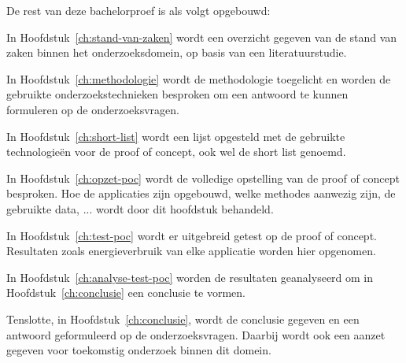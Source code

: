 
De rest van deze bachelorproef is als volgt opgebouwd:

In Hoofdstuk~\ref{ch:stand-van-zaken} wordt een overzicht gegeven van de stand van zaken binnen het onderzoeksdomein, op basis van een literatuurstudie.

In Hoofdstuk~\ref{ch:methodologie} wordt de methodologie toegelicht en worden de gebruikte onderzoekstechnieken besproken om een antwoord te kunnen formuleren op de onderzoeksvragen.

In Hoofdstuk~\ref{ch:short-list} wordt een lijst opgesteld met de gebruikte technologieën voor de proof of concept, ook wel de short list genoemd.

In Hoofdstuk~\ref{ch:opzet-poc} wordt de volledige opstelling van de proof of concept besproken. Hoe de applicaties zijn opgebouwd, welke methodes aanwezig zijn, de gebruikte data, ... wordt door dit hoofdstuk behandeld.

In Hoofdstuk~\ref{ch:test-poc} wordt er uitgebreid getest op de proof of concept. Resultaten zoals energieverbruik van elke applicatie worden hier opgenomen. 

In Hoofdstuk~\ref{ch:analyse-test-poc} worden de resultaten geanalyseerd om in Hoofdstuk~\ref{ch:conclusie} een conclusie te vormen.


Tenslotte, in Hoofdstuk~\ref{ch:conclusie}, wordt de conclusie gegeven en een antwoord geformuleerd op de onderzoeksvragen. Daarbij wordt ook een aanzet gegeven voor toekomstig onderzoek binnen dit domein.